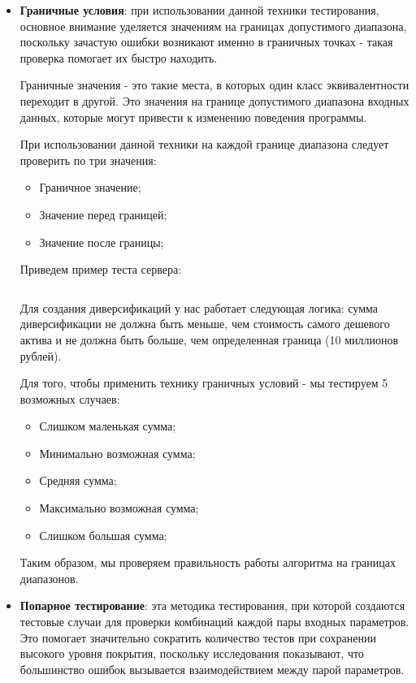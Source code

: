 \documentclass[a4paper, 14pt]{article}
\begin{document}
\begin{itemize}
    \item \textbf{Граничные условия}: при использовании данной техники тестирования, основное внимание уделяется значениям на границах допустимого диапазона, поскольку зачастую ошибки возникают именно в граничных точках - такая проверка помогает их быстро находить.

    Граничные значения - это такие места, в которых один класс эквивалентности переходит в другой. Это значения на границе допустимого диапазона входных данных, которые могут привести к изменению поведения программы.

    При использовании данной техники на каждой границе диапазона следует проверить по три значения:
    \begin{itemize}
        \item Граничное значение;
        \item Значение перед границей;
        \item Значение после границы;
    \end{itemize}

    Приведем пример теста сервера:
    \normalsize
    \inputminted[frame=single]{Java}{./code/2.java}
    \large

    Для создания диверсификаций у нас работает следующая логика: сумма диверсификации не должна быть меньше, чем стоимость самого дешевого актива и не должна быть больше, чем определенная граница (10 миллионов рублей).

    Для того, чтобы применить технику граничных условий - мы тестируем 5 возможных случаев:
    \begin{itemize}
        \item Слишком маленькая сумма;
        \item Минимально возможная сумма;
        \item Средняя сумма;
        \item Максимально возможная сумма;
        \item Слишком большая сумма;
    \end{itemize}

    Таким образом, мы проверяем правильность работы алгоритма на границах диапазонов.

    \item \textbf{Попарное тестирование}: эта методика тестирования, при которой создаются тестовые случаи для проверки комбинаций каждой пары входных параметров. Это помогает значительно сократить количество тестов при сохранении высокого уровня покрытия, поскольку исследования показывают, что большинство ошибок вызывается взаимодействием между парой параметров.


\end{itemize}
\end{document}
